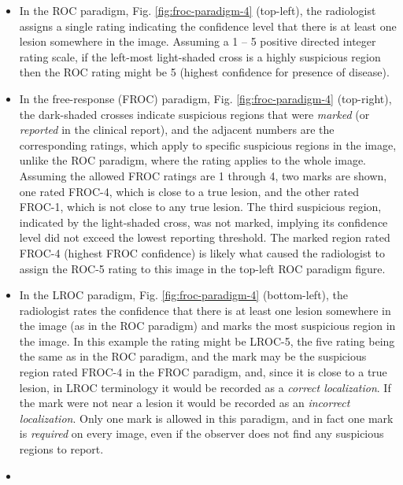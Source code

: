 \documentclass[
]{book}
\begin{document}
\begin{itemize}
\item
  In the ROC paradigm, Fig. \ref{fig:froc-paradigm-4} (top-left), the radiologist assigns a single rating indicating the confidence level that there is at least one lesion somewhere in the image. Assuming a 1 -- 5 positive directed integer rating scale, if the left-most light-shaded cross is a highly suspicious region then the ROC rating might be 5 (highest confidence for presence of disease).
\item
  In the free-response (FROC) paradigm, Fig. \ref{fig:froc-paradigm-4} (top-right), the dark-shaded crosses indicate suspicious regions that were \emph{marked} (or \emph{reported} in the clinical report), and the adjacent numbers are the corresponding ratings, which apply to specific suspicious regions in the image, unlike the ROC paradigm, where the rating applies to the whole image. Assuming the allowed FROC ratings are 1 through 4, two marks are shown, one rated FROC-4, which is close to a true lesion, and the other rated FROC-1, which is not close to any true lesion. The third suspicious region, indicated by the light-shaded cross, was not marked, implying its confidence level did not exceed the lowest reporting threshold. The marked region rated FROC-4 (highest FROC confidence) is likely what caused the radiologist to assign the ROC-5 rating to this image in the top-left ROC paradigm figure.
\item
  In the LROC paradigm, Fig. \ref{fig:froc-paradigm-4} (bottom-left), the radiologist rates the confidence that there is at least one lesion somewhere in the image (as in the ROC paradigm) and marks the most suspicious region in the image. In this example the rating might be LROC-5, the five rating being the same as in the ROC paradigm, and the mark may be the suspicious region rated FROC-4 in the FROC paradigm, and, since it is close to a true lesion, in LROC terminology it would be recorded as a \emph{correct localization}. If the mark were not near a lesion it would be recorded as an \emph{incorrect localization}. Only one mark is allowed in this paradigm, and in fact one mark is \emph{required} on every image, even if the observer does not find any suspicious regions to report.
\item

\end{itemize}
\end{document}
